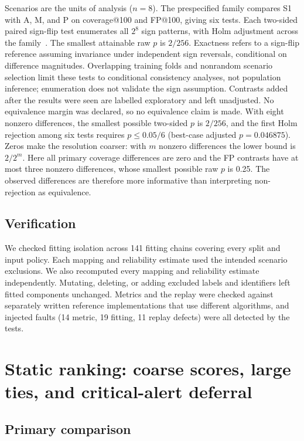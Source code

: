 \documentclass[pdflatex,sn-basic,Numbered]{sn-jnl}
\begin{document}
Scenarios are the units of analysis ($n=8$). The prespecified family compares S1 with A, M, and P on coverage@100 and FP@100, giving six tests. Each two-sided paired sign-flip test enumerates all $2^8$ sign patterns, with Holm adjustment across the family~\citep{Holm1979Sequential}. The smallest attainable raw $p$ is $2/256$. Exactness refers to a sign-flip reference assuming invariance under independent sign reversals, conditional on difference magnitudes. Overlapping training folds and nonrandom scenario selection limit these tests to conditional consistency analyses, not population inference; enumeration does not validate the sign assumption. Contrasts added after the results were seen are labelled exploratory and left unadjusted. No equivalence margin was declared, so no equivalence claim is made. With eight nonzero differences, the smallest possible two-sided $p$ is $2/256$, and the first Holm rejection among six tests requires $p\leq 0.05/6$ (best-case adjusted $p=0.046875$). Zeros make the resolution coarser: with $m$ nonzero differences the lower bound is $2/2^m$. Here all primary coverage differences are zero and the FP contrasts have at most three nonzero differences, whose smallest possible raw $p$ is 0.25. The observed differences are therefore more informative than interpreting non-rejection as equivalence.

\subsection{Verification}

We checked fitting isolation across 141 fitting chains covering every split and input policy. Each mapping and reliability estimate used the intended scenario exclusions. We also recomputed every mapping and reliability estimate independently. Mutating, deleting, or adding excluded labels and identifiers left fitted components unchanged. Metrics and the replay were checked against separately written reference implementations that use different algorithms, and injected faults (14 metric, 19 fitting, 11 replay defects) were all detected by the tests.


\section{Static ranking: coarse scores, large ties, and critical-alert deferral}
\label{sec:static}

\subsection{Primary comparison}
\end{document}
